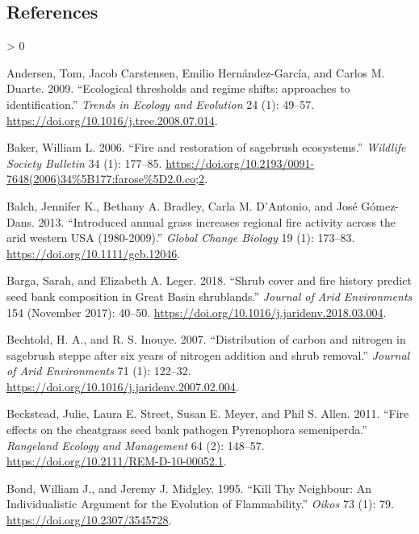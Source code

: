 \documentclass[
  12pt,
]{article}
\newlength{\cslhangindent}
\newenvironment{CSLReferences}[2] %
 {%
  \setlength{\parindent}{0pt}
  \ifodd #1 \everypar{\setlength{\hangindent}{\cslhangindent}}\ignorespaces\fi
  \ifnum #2 > 0
  \setlength{\parskip}{#2\baselineskip}
  \fi
 }%
 {}
\begin{document}
\hypertarget{references}{%
\subsection{References}\label{references}}

\singlespacing

\hypertarget{refs}{}
\begin{CSLReferences}{1}{0}
\leavevmode\hypertarget{ref-Andersen2009}{}%
Andersen, Tom, Jacob Carstensen, Emilio Hernández-García, and Carlos M.
Duarte. 2009. {``{Ecological thresholds and regime shifts: approaches to
identification}.''} \emph{Trends in Ecology and Evolution} 24 (1):
49--57. \url{https://doi.org/10.1016/j.tree.2008.07.014}.

\leavevmode\hypertarget{ref-Baker2006}{}%
Baker, William L. 2006. {``{Fire and restoration of sagebrush
ecosystems}.''} \emph{Wildlife Society Bulletin} 34 (1): 177--85.
\url{https://doi.org/10.2193/0091-7648(2006)34\%5B177:farose\%5D2.0.co;2}.

\leavevmode\hypertarget{ref-Balch2013}{}%
Balch, Jennifer K., Bethany A. Bradley, Carla M. D'Antonio, and José
Gómez-Dans. 2013. {``{Introduced annual grass increases regional fire
activity across the arid western USA (1980-2009)}.''} \emph{Global
Change Biology} 19 (1): 173--83.
\url{https://doi.org/10.1111/gcb.12046}.

\leavevmode\hypertarget{ref-Barga2018}{}%
Barga, Sarah, and Elizabeth A. Leger. 2018. {``{Shrub cover and fire
history predict seed bank composition in Great Basin shrublands}.''}
\emph{Journal of Arid Environments} 154 (November 2017): 40--50.
\url{https://doi.org/10.1016/j.jaridenv.2018.03.004}.

\leavevmode\hypertarget{ref-Bechtold2007}{}%
Bechtold, H. A., and R. S. Inouye. 2007. {``{Distribution of carbon and
nitrogen in sagebrush steppe after six years of nitrogen addition and
shrub removal}.''} \emph{Journal of Arid Environments} 71 (1): 122--32.
\url{https://doi.org/10.1016/j.jaridenv.2007.02.004}.

\leavevmode\hypertarget{ref-Beckstead2011}{}%
Beckstead, Julie, Laura E. Street, Susan E. Meyer, and Phil S. Allen.
2011. {``{Fire effects on the cheatgrass seed bank pathogen Pyrenophora
semeniperda}.''} \emph{Rangeland Ecology and Management} 64 (2):
148--57. \url{https://doi.org/10.2111/REM-D-10-00052.1}.

\leavevmode\hypertarget{ref-Bond1995}{}%
Bond, William J., and Jeremy J. Midgley. 1995. {``{Kill Thy Neighbour:
An Individualistic Argument for the Evolution of Flammability}.''}
\emph{Oikos} 73 (1): 79. \url{https://doi.org/10.2307/3545728}.


\end{CSLReferences}
\end{document}

